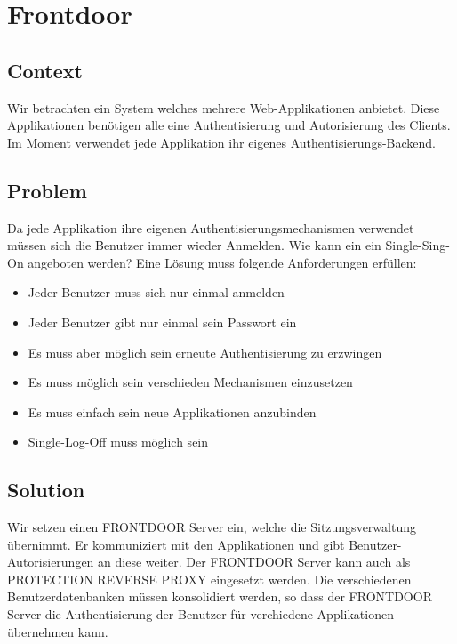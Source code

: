 \chapter{Frontdoor}

\section{Context}
Wir betrachten ein System welches mehrere Web-Applikationen anbietet. Diese Applikationen benötigen alle eine Authentisierung und Autorisierung des Clients. Im Moment verwendet jede Applikation ihr eigenes Authentisierungs-Backend.

\section{Problem}
Da jede Applikation ihre eigenen Authentisierungsmechanismen verwendet müssen sich die Benutzer immer wieder Anmelden. Wie kann ein ein Single-Sing-On angeboten werden? Eine Lösung muss folgende Anforderungen erfüllen:
\begin{itemize}
  \item Jeder Benutzer muss sich nur einmal anmelden
  \item Jeder Benutzer gibt nur einmal sein Passwort ein
  \item Es muss aber möglich sein erneute Authentisierung zu erzwingen
  \item Es muss möglich sein verschieden Mechanismen einzusetzen
  \item Es muss einfach sein neue Applikationen anzubinden
  \item Single-Log-Off muss möglich sein
\end{itemize}

\section{Solution}
Wir setzen einen FRONTDOOR Server ein, welche die Sitzungsverwaltung übernimmt. Er kommuniziert mit den Applikationen und gibt Benutzer-Autorisierungen an diese weiter. Der FRONTDOOR Server kann auch als PROTECTION REVERSE PROXY eingesetzt werden. Die verschiedenen Benutzerdatenbanken müssen konsolidiert werden, so dass der FRONTDOOR Server die Authentisierung der Benutzer für verchiedene Applikationen übernehmen kann.

